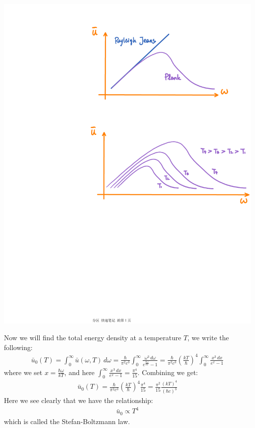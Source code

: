 \documentclass[11pt,oneside]{book}
\theoremstyle{break}
\theoremstyle{break}
\begin{document}
\begin{center}
\includegraphics[scale=0.69]{Plank.pdf}
\end{center}

Now we will find the total energy density at a temperature $T$, we write the following:
\begin{align*}
\bar{u}_0(T) = \int_0^\infty \bar{u}(\omega, T) \, d\omega = \frac{\hbar}{\pi^2 c^3}\int_0^\infty \frac{\omega^3 \, d\omega}{e^{\frac{\hbar\omega}{kT}}-1} = \frac{\hbar}{\pi^2 c^3}\left( \frac{kT}{\hbar}\right)^4 \int_0^\infty \frac{x^3\, dx}{e^x - 1}
\end{align*}
where we set $x = \frac{\hbar \omega}{kT}$, and here $\int_0^\infty \frac{x^3\, dx}{e^x - 1} = \frac{\pi^4}{15}$. Combining we get:
\begin{align*}
\bar{u}_0(T) = \frac{\hbar}{\pi^2 c^3}\left( \frac{kT}{\hbar}\right)^4 \frac{\pi^4}{15} = \frac{\pi^2}{15} \frac{(kT)^4}{(\hbar c)^3}
\end{align*}
Here we see clearly that we have the relationship:
\begin{align*}
\bar{u}_0\propto T^4 
\end{align*}
which is called the Stefan-Boltzmann law. 
\end{document}
